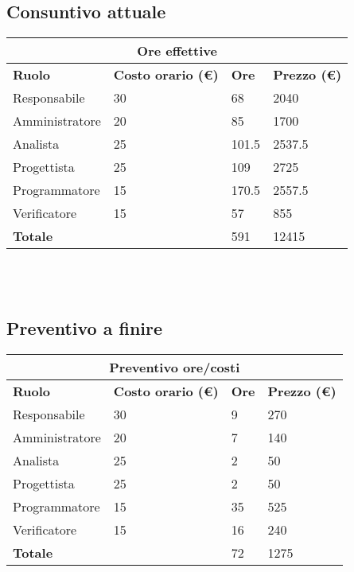 \documentclass[a4paper, 12pt]{article}
\begin{document}
\subsection{Consuntivo attuale}
\begin{center}
    \begin{tabularx}{\textwidth}{|X|X|X|X|}
        \hline
        \multicolumn{4}{|c|}{\textbf{Ore effettive}}\\
        \hline
        \hline
        \textbf{Ruolo} & \textbf{Costo orario (\euro)} & \textbf{Ore} & \textbf{Prezzo (\euro)}\\
        \hline
        Responsabile    & 30 & 68  & 2040\\
        \hline
        Amministratore  & 20 & 85  & 1700\\
        \hline
        Analista        & 25 & 101.5  & 2537.5 \\
        \hline
        Progettista     & 25 & 109  & 2725\\
        \hline
        Programmatore   & 15 & 170.5  & 2557.5\\
        \hline
        Verificatore    & 15 & 57  & 855 \\
        \hline
        \hline
        \textbf{Totale} &    & 591 & 12415\\
        \hline
    \end{tabularx}\\[8pt]
    \mbox{}\\
\end{center}

\subsection{Preventivo a finire}
\begin{center}
    \begin{tabularx}{\textwidth}{|X|X|X|X|}
        \hline
        \multicolumn{4}{|c|}{\textbf{Preventivo ore/costi}}\\
        \hline
        \hline
        \textbf{Ruolo} & \textbf{Costo orario (\euro)} & \textbf{Ore} & \textbf{Prezzo (\euro)}\\
        \hline
        Responsabile    & 30 & 9  & 270\\
        \hline
        Amministratore  & 20 & 7  & 140\\
        \hline
        Analista        & 25 & 2  & 50\\
        \hline
        Progettista     & 25 & 2  & 50\\
        \hline
        Programmatore   & 15 & 35  & 525\\
        \hline
        Verificatore    & 15 & 16  & 240\\
        \hline
        \hline
        \textbf{Totale} &    & 72 & 1275\\
        \hline
    \end{tabularx}\\[8pt]
    \mbox{}\\
\end{center}
\end{document}
